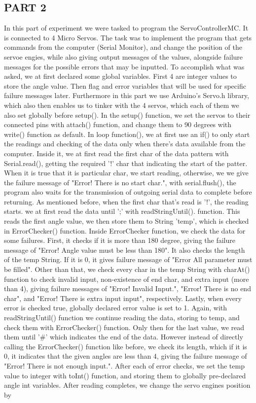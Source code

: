 \documentclass[pdftex,12pt,a4paper]{article}
\begin{document}
 
\subsection{PART 2}
In this part of experiment we were tasked to program the ServoControllerMC. It is connected to 4 Micro Servos. The task was to implement the program that gets commands from the computer (Serial Monitor), and change the position of the servoe engies, while also giving output messages of the values, alongside failure messages for the possible errors that may be inputted. To accomplish what was asked, we at first declared some global variables. First 4 are integer values to store the angle value. Then flag and error variables that will be used for specific failure messages later. Furthermore in this part we use Arduino's Servo.h library, which also then enables us to tinker with the 4 servos, which each of them we also set globally before setup(). In the setup() function, we set the servos to their connected pins with attach() function, and change them to 90 degrees with write() function as default. In loop function(), we at first use an if() to only start the readings and checking of the data only when there's data available from the computer. Inside it, we at first read the first char of the data pattern with Serial.read(), getting the required '!' char that indicating the start of the patter. When it is true that it is particular char, we start reading, otherwise, we we give the failure message of "Error! There is no start char.", with serial.flush(), the program also waits for the transmission of outgoing serial data to complete before returning. As mentioned before, when the first char that's read is '!', the reading starts. we at first read the data until ';' with readStringUntil(). function. This reads the first angle value, we then store them to String 'temp', which is checked in ErrorChecker() function. Inside ErrorChecker function, we check the data for some failures. First, it checks if it is more than 180 degree, giving the failure message of "Error! Angle value must be less than 180". It also checks the length of the temp String. If it is 0, it gives failure message of "Error All parameter must be filled". Other than that, we check every char in the temp String with charAt() function to check invalid input, non-existence of end char, and extra input (more than 4), giving failure messages of "Error! Invalid Input.", "Error! There is no end char", and "Error! There is extra input input", respectively. Lastly, when every error is checked true, globally declared error value is set to 1. Again, with readStringUntil() function we continue reading the data, storing to temp, and check them with ErrorChecker() function. Only then for the last value, we read them until '\#' which indicates the end of the data. However instead of directly calling the ErrorChecker() function like before, we check its length, which if it is 0, it indicates that the given angles are less than 4, giving the failure message of "Error! There is not enough input.". After each of error checks, we set the temp value to integer with toInt() function, and storing them to globally pre-declared angle int variables. After reading completes, we change the servo engines position by 
\end{document}
